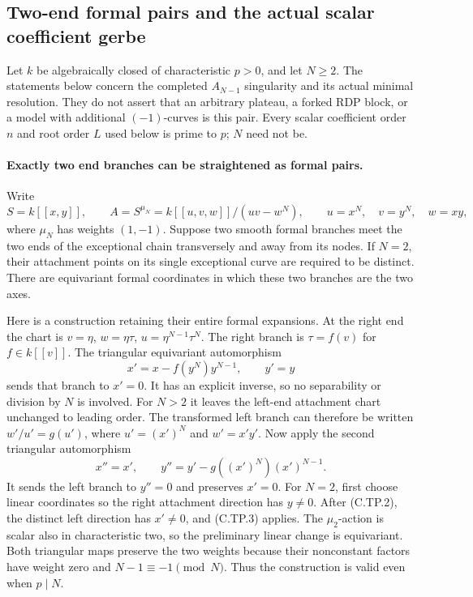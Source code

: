 \subsection*{Two-end formal pairs and the actual scalar coefficient gerbe}

Let $k$ be algebraically closed of characteristic $p>0$, and let
$N\ge2$.  The statements below concern the completed $A_{N-1}$
singularity and its actual minimal resolution.  They do not assert that
an arbitrary plateau, a forked RDP block, or a model with additional
$(-1)$-curves is this pair.  Every scalar coefficient order $n$ and
root order $L$ used below is prime to $p$; $N$ need not be.

\paragraph{Exactly two end branches can be straightened as formal pairs.}
Write
\[
 S=k[[x,y]],\qquad
 A=S^{\mu_N}=k[[u,v,w]]/(uv-w^N),\qquad
 u=x^N,\quad v=y^N,\quad w=xy,
                                                        \tag{C.TP.1}
\]
where $\mu_N$ has weights $(1,-1)$.  Suppose two smooth formal
branches meet the two ends of the exceptional chain transversely and
away from its nodes.  If $N=2$, their attachment points on its single
exceptional curve are required to be distinct.  There are equivariant
formal coordinates in which these two branches are the two axes.

Here is a construction retaining their entire formal expansions.
At the right end the chart is
$v=\eta$, $w=\eta\tau$, $u=\eta^{N-1}\tau^N$.
The right branch is $\tau=f(v)$ for $f\in k[[v]]$.
The triangular equivariant automorphism
\[
        x'=x-f(y^N)y^{N-1},\qquad y'=y                 \tag{C.TP.2}
\]
sends that branch to $x'=0$.  It has an explicit inverse, so no
separability or division by $N$ is involved.  For $N>2$ it leaves
the left-end attachment chart unchanged to leading order.  The
transformed left branch can therefore be written
$w'/u'=g(u')$, where $u'=(x')^N$ and $w'=x'y'$.
Now apply the second triangular automorphism
\[
        x''=x',\qquad
        y''=y'-g((x')^N)(x')^{N-1}.                   \tag{C.TP.3}
\]
It sends the left branch to $y''=0$ and preserves $x'=0$.
For $N=2$, first choose linear coordinates so the right attachment
direction has $y\ne0$.  After (C.TP.2), the distinct left direction
has $x'\ne0$, and (C.TP.3) applies.  The $\mu_2$-action is scalar
also in characteristic two, so the preliminary linear change is
equivariant.  Both triangular maps preserve the two weights because
their nonconstant factors have weight zero and $N-1\equiv-1\pmod N$.
Thus the construction is valid even when $p\mid N$.

